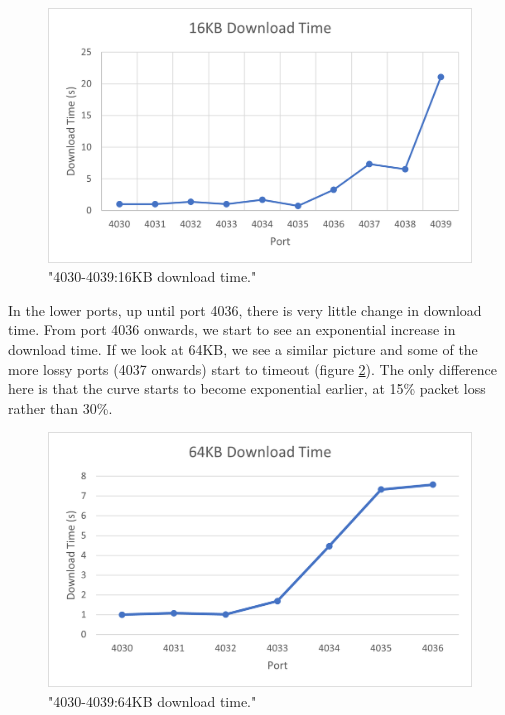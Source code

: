 \documentclass[12pt]{article}
\begin{document}
\begin{figure}[!htbp]
  \centering
  \includegraphics[width=\linewidth]{4030-4039-16KB-download-time.png}
  \caption{"4030-4039:16KB download time."}
  \label{figure9: 4030-4039:16KB download time}
\end{figure}

In the lower ports, up until port 4036, there is very little change in download time.
From port 4036 onwards, we start to see an exponential increase in download time.
If we look at 64KB, we see a similar picture and some of the more lossy ports (4037 onwards) start to timeout (figure \ref{figure10: 4030-4039:64KB download time}).
The only difference here is that the curve starts to become exponential earlier, at 15\% packet loss rather than 30\%.

\begin{figure}[!htbp]
  \centering
  \includegraphics[width=\linewidth]{4030-4039-64KB-download.png}
  \caption{"4030-4039:64KB download time."}
  \label{figure10: 4030-4039:64KB download time}
\end{figure}
\end{document}
